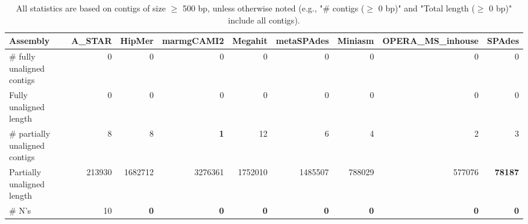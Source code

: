 \documentclass[12pt,a4paper]{article}
\begin{document}
\begin{table}[ht]
\begin{center}
\caption{All statistics are based on contigs of size $\geq$ 500 bp, unless otherwise noted (e.g., "\# contigs ($\geq$ 0 bp)" and "Total length ($\geq$ 0 bp)" include all contigs).}
\begin{tabular}{|l*{8}{|r}|}
\hline
Assembly & A\_STAR & HipMer & marmgCAMI2 & Megahit & metaSPAdes & Miniasm & OPERA\_MS\_inhouse & SPAdes \\ \hline
\# fully unaligned contigs & 0 & 0 & 0 & 0 & 0 & 0 & 0 & 0 \\ \hline
Fully unaligned length & 0 & 0 & 0 & 0 & 0 & 0 & 0 & 0 \\ \hline
\# partially unaligned contigs & 8 & 8 & {\bf 1} & 12 & 6 & 4 & 2 & 3 \\ \hline
Partially unaligned length & 213930 & 1682712 & 3276361 & 1752010 & 1485507 & 788029 & 577076 & {\bf 78187} \\ \hline
\# N's & 10 & {\bf 0} & {\bf 0} & {\bf 0} & {\bf 0} & {\bf 0} & {\bf 0} & {\bf 0} \\ \hline
\end{tabular}
\end{center}
\end{table}
\end{document}
